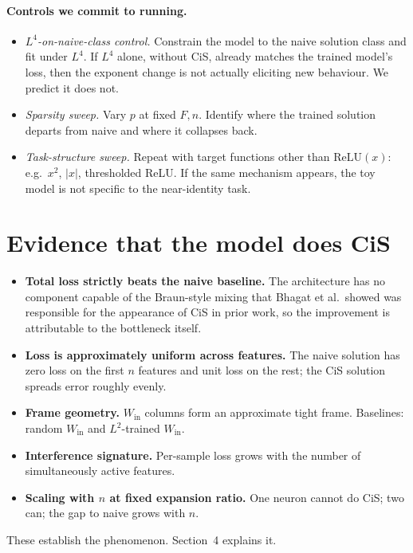 \documentclass[11pt]{article}
\begin{document}
\paragraph{Controls we commit to running.}
\begin{itemize}
\item \emph{$L^4$-on-naive-class control.} Constrain the model to the naive solution class and fit under $L^4$.
If $L^4$ alone, without CiS, already matches the trained model's loss, then the exponent change is not actually eliciting new behaviour.
We predict it does not.
\item \emph{Sparsity sweep.} Vary $p$ at fixed $F, n$.
Identify where the trained solution departs from naive and where it collapses back.
\item \emph{Task-structure sweep.} Repeat with target functions other than $\mathrm{ReLU}(x)$: e.g.\ $x^2$, $|x|$, thresholded ReLU.
If the same mechanism appears, the toy model is not specific to the near-identity task.
\end{itemize}

\section{Evidence that the model does CiS}

\begin{itemize}
\item \textbf{Total loss strictly beats the naive baseline.}
The architecture has no component capable of the Braun-style mixing that Bhagat et al.\ showed was responsible for the appearance of CiS in prior work, so the improvement is attributable to the bottleneck itself.
\item \textbf{Loss is approximately uniform across features.}
The naive solution has zero loss on the first $n$ features and unit loss on the rest; the CiS solution spreads error roughly evenly.
\item \textbf{Frame geometry.} $W_{\mathrm{in}}$ columns form an approximate tight frame.
Baselines: random $W_{\mathrm{in}}$ and $L^2$-trained $W_{\mathrm{in}}$.
\item \textbf{Interference signature.} Per-sample loss grows with the number of simultaneously active features.
\item \textbf{Scaling with $n$ at fixed expansion ratio.}
One neuron cannot do CiS; two can; the gap to naive grows with $n$.
\end{itemize}
These establish the phenomenon.
Section~4 explains it.
\end{document}
